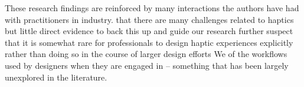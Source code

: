 These research findings are reinforced by many interactions the authors have had with practitioners in industry.
 that there are many challenges related to haptics\revOne{,} %
but  little direct evidence to back this up and guide our research %
 further suspect that it is somewhat rare for professionals to design haptic experiences explicitly rather than doing so in the course of larger design efforts
We  of the workflows used by designers when they are engaged in \haxd{} -- something that has been largely unexplored in the literature.

